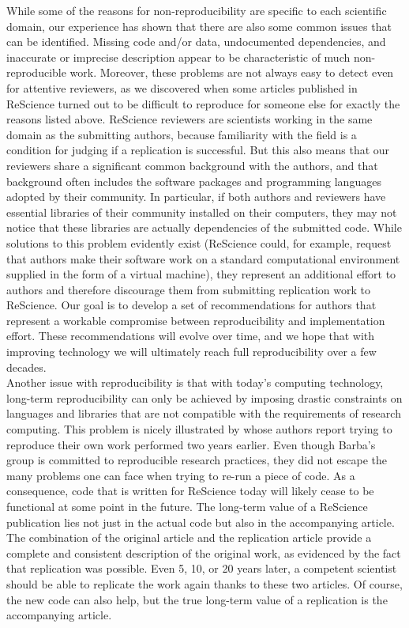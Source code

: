 \documentclass[a4paper,10pt, twocolumn]{article}
\begin{document}
While some of the reasons for non-reproducibility are specific to each
scientific domain, our experience has shown that there are also some
common issues that can be identified.  Missing code and/or data,
undocumented dependencies, and inaccurate or imprecise description
appear to be characteristic of much non-reproducible work. Moreover,
these problems are not always easy to detect even for attentive
reviewers, as we discovered when some articles published in ReScience
turned out to be difficult to reproduce for someone else for exactly
the reasons listed above. ReScience reviewers are scientists working
in the same domain as the submitting authors, because familiarity with
the field is a condition for judging if a replication is
successful. But this also means that our reviewers share a significant
common background with the authors, and that background often includes the
software packages and programming languages adopted by their
community.  In particular, if both authors and reviewers have
essential libraries of their community installed on their computers,
they may not notice that these libraries are actually dependencies of
the submitted code.  While solutions to this problem evidently exist
(ReScience could, for example, request that authors make their
software work on a standard computational environment supplied in the
form of a virtual machine), they represent an additional effort to
authors and therefore discourage them from submitting replication work to
ReScience.  Our goal is to develop a set of recommendations for
authors that represent a workable compromise between reproducibility
and implementation effort. These recommendations will evolve over time,
and we hope that with improving technology we will ultimately reach full
reproducibility over a few decades.\\

Another issue with reproducibility is that with today's computing
technology, long-term reproducibility can only be achieved by imposing
drastic constraints on languages and libraries that are not compatible
with the requirements of research computing. This problem is nicely
illustrated by \citet{Mesnard:2016} whose authors report trying to
reproduce their own work performed two years earlier. Even though
Barba's group is committed to reproducible research practices, they
did not escape the many problems one can face when trying to re-run a
piece of code. As a consequence, code that is written for ReScience
today will likely cease to be functional at some point in the future.
The long-term value of a ReScience publication lies not just in the
actual code but also in the accompanying article. The combination of the
original article and the replication article provide a complete and
consistent description of the original work, as evidenced by the fact
that replication was possible. Even 5, 10, or 20 years later, a
competent scientist should be able to replicate the work again thanks
to these two articles. Of course, the new code can also help, but the
true long-term value of a replication is the accompanying article.\\
\end{document}
